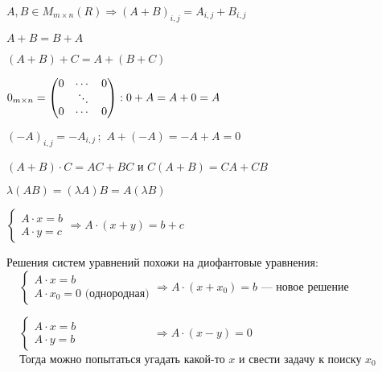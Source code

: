 \quad

\begin{definition}
    $A,B\in M_{m \times n}(R) \Longrightarrow (A+B)_{i,j} = A_{i,j}+B_{i,j}$
\end{definition}

\quad

\begin{properties} 
    \item $A+B = B+A$ 
    \item $(A + B) + C = A + (B + C)$
    \item $0_{m \times n} = \begin{pmatrix}
        0&\cdots&0\\
        &\rotatebox{135}{$\cdots$}\\
        0&\cdots&0
    \end{pmatrix} : 0 + A = A + 0 = A$ 
    \item $(-A)_{i,j} = -A_{i, j}\,;\,\, A + (-A) = -A + A = 0$
    \item $(A + B) \cdot C = A C + B C$ и $C ( A + B) = CA + CB$
\end{properties}

\quad

\begin{remark}
    $\lambda (A B) = (\lambda A)B = A (\lambda B)$
\end{remark}

\quad

\begin{remark}
    $
\begin{cases}
    A \cdot x = b \\
    A \cdot y = c
\end{cases} \Longrightarrow A \cdot (x + y) = b + c
$
\end{remark}

\begin{remark} Решения систем уравнений похожи на диофантовые уравнения:\\

\quad\quad\quad\quad\quad\,\,\,\,\,    $
\begin{cases}
    A \cdot x = b \\
    A \cdot x_0 = 0 \text{ (однородная)}
\end{cases} \Longrightarrow A \cdot (x + x_0) = b
$     --- новое решение

\quad\quad\quad\quad\quad\,\,\,\,\,
$
\begin{cases}
    A \cdot x = b \\
    A \cdot y = b 
\end{cases} \quad \quad\quad\quad\quad\quad\,\,\, \Longrightarrow A \cdot (x - y) = 0
$     
\\

\quad\quad\quad\quad\quad\,\,\,\,\, Тогда можно попытаться угадать какой-то $x$ и свести задачу к поиску $x_0$
\end{remark}


